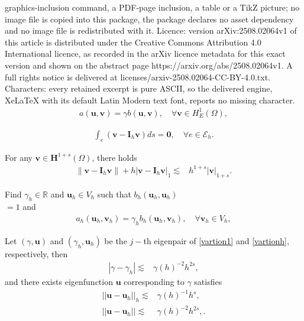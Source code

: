 \documentclass[10pt,a4paper]{amsart}
\def\E{{\mathcal{E}}}
\def\b0{\boldsymbol{0}}
\def\bh{{\mathbf{H}}}
\def\bi{{\mathbf{I}}}
\def\bu{{\mathbf{u}}}
\def\bv{{\mathbf{v}}}
\newcommand{\Real}{\mathbb{R}}
\begin{document}
graphics-inclusion command, a PDF-page inclusion, a table or a TikZ picture; no image file is copied into this package, the package declares no asset dependency and no image file is redistributed with it. Licence: version arXiv:2508.02064v1 of this article is distributed under the Creative Commons Attribution 4.0 International licence, as recorded in the arXiv licence metadata for this exact version and shown on the abstract page https://arxiv.org/abs/2508.02064v1. A full rights notice is delivered at licenses/arxiv-2508.02064-CC-BY-4.0.txt. Characters: every retained excerpt is pure ASCII, so the delivered engine, XeLaTeX with its default Latin Modern text font, reports no missing character.
\begin{eqnarray}\label{vartion1}
	a(\bu,\bv)=\gamma b(\bu,\bv),\quad\forall\bv\in H_E^1(\Omega),
\end{eqnarray}

\begin{eqnarray}\label{CR-int}
	\int_{e}(\bv-\bi_h\bv)ds=\b0,\quad\forall e\in\E_h.
\end{eqnarray}

\begin{lemma}
	For any $\bv\in\bh^{1+s}(\Omega)$, there holds
\begin{align}\label{errint}
	\|\bv-\bi_h\bv\|+h|\bv-\bi_h\bv|_1\lesssim& h^{1+s}|\bv|_{1+s}.
\end{align}
\end{lemma}

\begin{algorithm}Find $\gamma_h\in\Real$ and $\bu_h\in V_h$ such that $b_h(\bu_h,\bu_h)$\\$=1$ and
	\begin{eqnarray}\label{vartionh}
		a_h(\bu_h,\bv_h)=\gamma_hb_h(\bu_h,\bv_h),\quad\forall\bv_h\in V_h,
	\end{eqnarray}
\end{algorithm}

\begin{lemma}
	Let $(\gamma,\bu)$ and $(\gamma_h,\bu_h)$ be the $j-$th eigenpair of \eqref{vartion1} and \eqref{vartionh}, respectively, then
	\begin{align}
		|\gamma-\gamma_h|\lesssim&\gamma(h)^{-2}h^{2s},
	\end{align}
	and there exists eigenfunction $\bu$ corresponding to $\gamma$ satisfies
	\begin{align}
		||\bu-\bu_h||_h\lesssim& \gamma(h)^{-1}h^s,\label{errH1}\\
		||\bu-\bu_h||\lesssim& \gamma(h)^{-2}h^{2s},\label{errL2}.
	\end{align}
\end{lemma}
\end{document}
